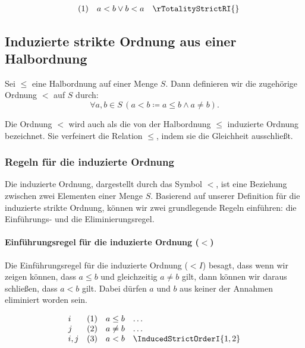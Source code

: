 \documentclass[main.tex]{subfiles}
\begin{document}
\[
\begin{array}{llll}
       & (1) & a < b \lor b < a & \rTotalityStrictRI{}
\end{array}
\]

\subsection{Induzierte strikte Ordnung aus einer Halbordnung}

\begin{definition}
    Sei \(\leq\) eine Halbordnung auf einer Menge \(S\). Dann definieren wir die zugehörige Ordnung \(<\) auf \(S\) durch:
    \[
    \forall a, b \in S \, (a < b \coloneqq a \leq b \land a \neq b).
    \]
\end{definition}

\begin{remark}
    Die Ordnung \(<\) wird auch als die von der Halbordnung \(\leq\) induzierte  Ordnung bezeichnet. Sie verfeinert die Relation \(\leq\), indem sie die Gleichheit ausschließt.
\end{remark}

\subsubsection{Regeln für die induzierte Ordnung}
\label{rule:InducedStrictOrderE} \label{rule:InducedStrictOrderI}

Die induzierte Ordnung, dargestellt durch das Symbol \(<\), ist eine Beziehung zwischen zwei Elementen einer Menge \(S\). Basierend auf unserer Definition für die induzierte strikte Ordnung, können wir zwei grundlegende Regeln einführen: die Einführungs- und die Eliminierungsregel.

\paragraph{Einführungsregel für die induzierte Ordnung (\(<\))}
Die Einführungsregel für die induzierte Ordnung (\(< I\)) besagt, dass wenn wir zeigen können, dass \(a \leq b\) und gleichzeitig \(a \neq b\) gilt, dann können wir daraus schließen, dass \(a < b\) gilt. Dabei dürfen \(a\) und \(b\) aus keiner der Annahmen eliminiert worden sein.

\[
\begin{array}{llll}
    i   & (1) & a \leq b & \dots \\
    j   & (2) & a \neq b & \dots \\
    i,j & (3) & a < b & \InducedStrictOrderI{1,2}
\end{array}
\]
\end{document}
